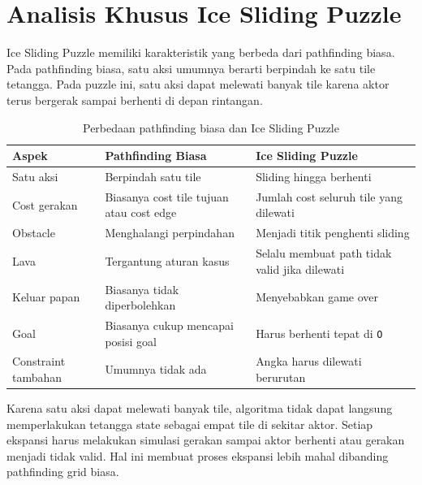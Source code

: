 \section{Analisis Khusus Ice Sliding Puzzle}

Ice Sliding Puzzle memiliki karakteristik yang berbeda dari pathfinding biasa. 
Pada pathfinding biasa, satu aksi umumnya berarti berpindah ke satu tile tetangga. 
Pada puzzle ini, satu aksi dapat melewati banyak tile karena aktor terus bergerak sampai berhenti di depan rintangan.

\begin{table}[H]
	\centering
	\caption{Perbedaan pathfinding biasa dan Ice Sliding Puzzle}
	\begin{tabular}{|p{4.5cm}|p{4.5cm}|p{5cm}|}
		\hline
		\rowcolor{cyan!15}
		\textbf{Aspek} & \textbf{Pathfinding Biasa} & \textbf{Ice Sliding Puzzle} \\
		\hline
		Satu aksi & Berpindah satu tile & Sliding hingga berhenti \\
		\hline
		Cost gerakan & Biasanya cost tile tujuan atau cost edge & Jumlah cost seluruh tile yang dilewati \\
		\hline
		Obstacle & Menghalangi perpindahan & Menjadi titik penghenti sliding \\
		\hline
		Lava & Tergantung aturan kasus & Selalu membuat path tidak valid jika dilewati \\
		\hline
		Keluar papan & Biasanya tidak diperbolehkan & Menyebabkan game over \\
		\hline
		Goal & Biasanya cukup mencapai posisi goal & Harus berhenti tepat di \texttt{O} \\
		\hline
		Constraint tambahan & Umumnya tidak ada & Angka harus dilewati berurutan \\
		\hline
	\end{tabular}
\end{table}

\begin{tcolorbox}[
	colback=cyan!5,
	colframe=cyan!60!black,
	title=\textbf{Dampak Karakteristik Sliding terhadap Algoritma},
	arc=2mm,
	boxrule=0.8pt
]
Karena satu aksi dapat melewati banyak tile, algoritma tidak dapat langsung memperlakukan tetangga state sebagai empat tile di sekitar aktor. 
Setiap ekspansi harus melakukan simulasi gerakan sampai aktor berhenti atau gerakan menjadi tidak valid. 
Hal ini membuat proses ekspansi lebih mahal dibanding pathfinding grid biasa.
\end{tcolorbox}

